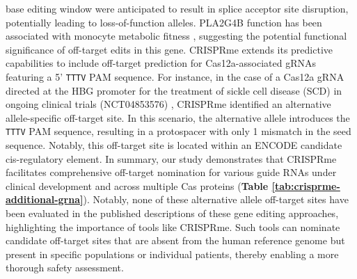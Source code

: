 \documentclass[a4paper, titlepage, openright]{book}
\newcommand{\crisprme}{CRISPRme\xspace}
\begin{document}
base editing window were anticipated to result in splice acceptor site disruption, potentially leading to loss-of-function alleles. PLA2G4B function has been associated with monocyte metabolic fitness \citep{saare2020monocytes}, suggesting the potential functional significance of off-target edits in this gene. \crisprme extends its predictive capabilities to include off-target prediction for Cas12a-associated gRNAs featuring a 5’ \texttt{TTTV} PAM sequence. For instance, in the case of a Cas12a gRNA directed at the HBG promoter for the treatment of sickle cell disease (SCD) in ongoing clinical trials (NCT04853576) \citep{morgan2020ex}, \crisprme identified an alternative allele-specific off-target site. In this scenario, the alternative allele introduces the \texttt{TTTV} PAM sequence, resulting in a protospacer with only 1 mismatch in the seed sequence. Notably, this off-target site is located within an ENCODE candidate cis-regulatory element. In summary, our study demonstrates that \crisprme facilitates comprehensive off-target nomination for various guide RNAs under clinical development and across multiple Cas proteins (\textbf{Table \ref{tab:crisprme-additional-grna}}). Notably, none of these alternative allele off-target sites have been evaluated in the published descriptions of these gene editing approaches, highlighting the importance of tools like \crisprme. Such tools can nominate candidate off-target sites that are absent from the human reference genome but present in specific populations or individual patients, thereby enabling a more thorough safety assessment.
\end{document}
